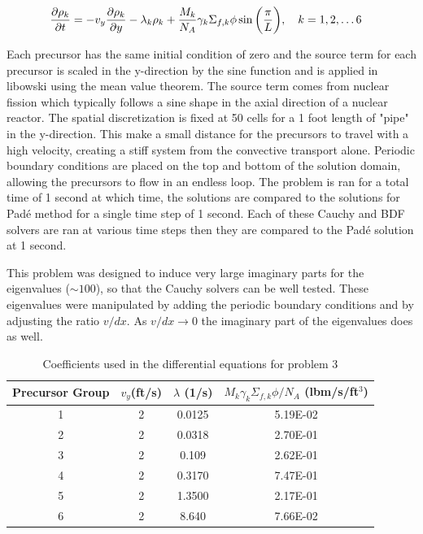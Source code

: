 \begin{equation}
\setlength{\jot}{15pt}
\begin{split}
    \frac{\partial \rho_{k}}{\partial t} = -v_{y}\frac{\partial \rho_{k}}{\partial y} - \lambda_{k}\rho_{k}& + \frac{M_{k}}{N_{A}}\gamma_{k}\Sigma_{f,k}\phi\sin\bigg(\frac{\pi}{L}\bigg), \quad k = 1, 2, \ldots 6
\end{split}
\label{eq:problem3}
\end{equation}

\noindent Each precursor has the same initial condition of zero and the source term for each precursor is scaled in the y-direction by the sine function and is applied in libowski using the mean value theorem. The source term comes from nuclear fission which typically follows a sine shape in the axial direction of a nuclear reactor. The spatial discretization is fixed at 50 cells for a 1 foot length of "pipe" in the y-direction. This make a small distance for the precursors to travel with a high velocity, creating a stiff system from the convective transport alone. Periodic boundary conditions are placed on the top and bottom of the solution domain, allowing the precursors to flow in an endless loop. The problem is ran for a total time of 1 second at which time, the solutions are compared to the solutions for Pad\'e method for a single time step of 1 second. Each of these Cauchy and BDF solvers are ran at various time steps then they are compared to the Pad\'e solution at 1 second. 

This problem was designed to induce very large imaginary parts for the eigenvalues ($\sim 100$), so that the Cauchy solvers can be well tested. These eigenvalues were manipulated by adding the periodic boundary conditions and by adjusting the ratio $v/dx$. As $v/dx \xrightarrow{} 0$ the imaginary part of the eigenvalues does as well.  


\begin{table}[b]
    \caption{\label{tab:problem3Coeffs} Coefficients used in the differential equations for problem 3}
    \centering
    \begin{tabular}{c|c|c|c}
    \hline
    Precursor Group & $v_{y}$(ft/s) &$\lambda $ (1/s) & $M_{k}\gamma_{k}\Sigma_{f,k}\phi/N_{A}$ (lbm/s/ft$^{3}$) \\
    \hline
    \hline
    1 & 2 & 0.0125 & 5.19E-02  \\  
    \hline
    2 & 2 & 0.0318 & 2.70E-01 \\  
    \hline
    3 & 2 & 0.109 & 2.62E-01 \\  
    \hline
    4 & 2 & 0.3170 & 7.47E-01 \\  
    \hline
    5 & 2 & 1.3500 & 2.17E-01 \\  
    \hline
    6 & 2 & 8.640  & 7.66E-02 \\  
    \hline
    \end{tabular}
\end{table}

